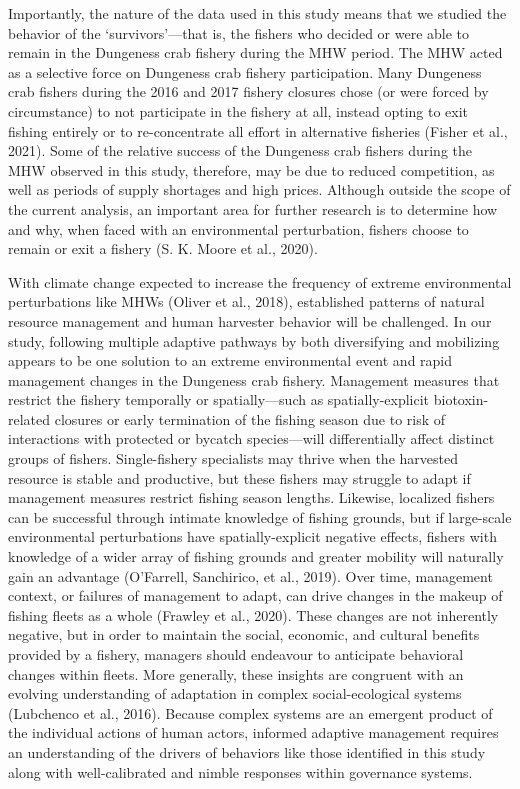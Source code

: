 \documentclass[]{elsarticle} %
\begin{document}
Importantly, the nature of the data used in this study means that we
studied the behavior of the `survivors'---that is, the fishers who
decided or were able to remain in the Dungeness crab fishery during the
MHW period. The MHW acted as a selective force on Dungeness crab fishery
participation. Many Dungeness crab fishers during the 2016 and 2017
fishery closures chose (or were forced by circumstance) to not
participate in the fishery at all, instead opting to exit fishing
entirely or to re-concentrate all effort in alternative fisheries
(Fisher et al., 2021). Some of the relative success of the Dungeness
crab fishers during the MHW observed in this study, therefore, may be
due to reduced competition, as well as periods of supply shortages and
high prices. Although outside the scope of the current analysis, an
important area for further research is to determine how and why, when
faced with an environmental perturbation, fishers choose to remain or
exit a fishery (S. K. Moore et al., 2020).

With climate change expected to increase the frequency of extreme
environmental perturbations like MHWs (Oliver et al., 2018), established
patterns of natural resource management and human harvester behavior
will be challenged. In our study, following multiple adaptive pathways
by both diversifying and mobilizing appears to be one solution to an
extreme environmental event and rapid management changes in the
Dungeness crab fishery. Management measures that restrict the fishery
temporally or spatially---such as spatially-explicit biotoxin-related
closures or early termination of the fishing season due to risk of
interactions with protected or bycatch species---will differentially
affect distinct groups of fishers. Single-fishery specialists may thrive
when the harvested resource is stable and productive, but these fishers
may struggle to adapt if management measures restrict fishing season
lengths. Likewise, localized fishers can be successful through intimate
knowledge of fishing grounds, but if large-scale environmental
perturbations have spatially-explicit negative effects, fishers with
knowledge of a wider array of fishing grounds and greater mobility will
naturally gain an advantage (O'Farrell, Sanchirico, et al., 2019). Over
time, management context, or failures of management to adapt, can drive
changes in the makeup of fishing fleets as a whole (Frawley et al.,
2020). These changes are not inherently negative, but in order to
maintain the social, economic, and cultural benefits provided by a
fishery, managers should endeavour to anticipate behavioral changes
within fleets. More generally, these insights are congruent with an
evolving understanding of adaptation in complex social-ecological
systems (Lubchenco et al., 2016). Because complex systems are an
emergent product of the individual actions of human actors, informed
adaptive management requires an understanding of the drivers of
behaviors like those identified in this study along with well-calibrated
and nimble responses within governance systems.
\end{document}
